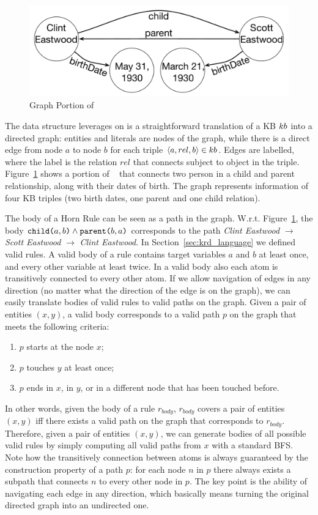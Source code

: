 \begin{figure}[t]
	\centering
	\includegraphics[width=0.6\columnwidth]{include/figure/graph_example.pdf}
	\caption{Graph Portion of \dbpedia}
	\label{fig:krd_graph_example}
\end{figure}

The data structure \krd leverages on is a straightforward translation of a KB ${\sc kb}$ into a directed graph: entities and literals are nodes of the graph, while there is a direct edge from node $a$ to node $b$ for each triple $\langle a,rel,b\rangle \in {\sc kb}$. Edges are labelled, where the label is the relation $rel$ that connects subject to object in the triple. Figure~\ref{fig:krd_graph_example} shows a portion of \dbpedia~\cite{bizer2009dbpedia} that connects two person in a child and parent relationship, along with their dates of birth. The graph represents information of four KB triples (two birth dates, one parent and one child relation).

The body of a Horn Rule can be seen as a path in the graph. W.r.t. Figure~\ref{fig:krd_graph_example}, the body $\texttt{child(}a,b\texttt{)} \wedge \texttt{parent(}b,a\texttt{)}$ corresponds to the path \textit{Clint Eastwood} $\rightarrow$ \textit{Scott Eastwood} $\rightarrow$ \textit{Clint Eastwood}. In Section~\ref{sec:krd_language} we defined valid rules. A valid body of a rule contains target variables $a$ and $b$ at least once, and every other variable at least twice. In a valid body also each atom is transitively connected to every other atom. 
If we allow navigation of edges in any direction (no matter what the direction of the edge is on the graph), we can easily translate bodies of valid rules to valid paths on the graph.
Given a pair of entities $(x,y)$, a valid body corresponds to a valid path $p$ on the graph that meets the following criteria:
\begin{enumerate}
	\item $p$ starts at the node $x$;
	\item $p$ touches $y$ at least once;
	\item $p$ ends in $x$, in $y$, or in a different node that has been touched before.
\end{enumerate}
In other words, given the body of a rule $r_{body}$, $r_{body}$ covers a pair of entities $(x,y)$ iff there exists a valid path on the graph that corresponds to $r_{body}$. Therefore, given a pair of entities $(x,y)$, we can generate bodies of all possible valid rules by simply computing all valid paths from $x$ with a standard BFS. Note how the transitively connection between atoms is always guaranteed by the construction property of a path $p$: for each node $n$ in $p$ there always exists a subpath that connects $n$ to every other node in $p$. The key point is the ability of navigating each edge in any direction, which basically means turning the original directed graph into an undirected one.

